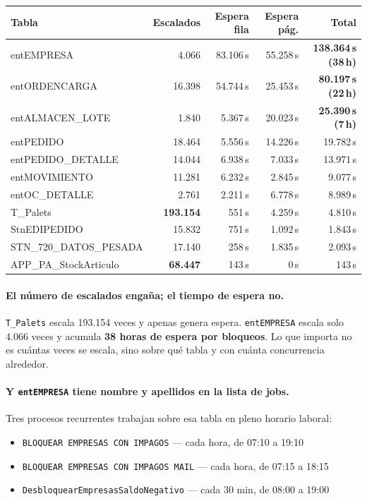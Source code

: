 \documentclass[11pt,a4paper]{article}
\newcommand{\cod}[1]{\texttt{\small #1}}
\newcommand{\critico}[1]{\textcolor{rojo}{\textbf{#1}}}
\newcommand{\aviso}[1]{\textcolor{ambar}{\textbf{#1}}}
\begin{document}
\begin{table}[h]
\centering
\small
\begin{tabular}{lrrrr}
\toprule
\textbf{Tabla} & \textbf{Escalados} & \textbf{Espera fila} &
\textbf{Espera pág.} & \textbf{Total} \\
\midrule
entEMPRESA        &  4.066 & 83.106\,s & 55.258\,s & \critico{138.364\,s (38\,h)} \\
entORDENCARGA     & 16.398 & 54.744\,s & 25.453\,s & \critico{80.197\,s (22\,h)} \\
entALMACEN\_LOTE  &  1.840 &  5.367\,s & 20.023\,s & \critico{25.390\,s (7\,h)} \\
entPEDIDO         & 18.464 &  5.556\,s & 14.226\,s & 19.782\,s \\
entPEDIDO\_DETALLE& 14.044 &  6.938\,s &  7.033\,s & 13.971\,s \\
entMOVIMIENTO     & 11.281 &  6.232\,s &  2.845\,s &  9.077\,s \\
entOC\_DETALLE    &  2.761 &  2.211\,s &  6.778\,s &  8.989\,s \\
T\_Palets         & \aviso{193.154} & 551\,s & 4.259\,s & 4.810\,s \\
StnEDIPEDIDO      & 15.832 & 751\,s & 1.092\,s & 1.843\,s \\
STN\_720\_DATOS\_PESADA & 17.140 & 258\,s & 1.835\,s & 2.093\,s \\
APP\_PA\_StockArticulo & \aviso{68.447} & 143\,s & 0\,s & 143\,s \\
\bottomrule
\end{tabular}
\end{table}

\paragraph{El número de escalados engaña; el tiempo de espera no.}
\cod{T\_Palets} escala 193.154 veces y apenas genera espera.
\cod{entEMPRESA} escala solo 4.066 veces y acumula \textbf{38 horas de espera
por bloqueos}. Lo que importa no es cuántas veces se escala, sino sobre qué
tabla y con cuánta concurrencia alrededor.

\paragraph{Y \cod{entEMPRESA} tiene nombre y apellidos en la lista de jobs.}
Tres procesos recurrentes trabajan sobre esa tabla en pleno horario laboral:

\begin{itemize}\itemsep1pt
  \item \cod{BLOQUEAR EMPRESAS CON IMPAGOS} — cada hora, de 07:10 a 19:10
  \item \cod{BLOQUEAR EMPRESAS CON IMPAGOS MAIL} — cada hora, de 07:15 a 18:15
  \item \cod{DesbloquearEmpresasSaldoNegativo} — cada 30 min, de 08:00 a 19:00
\end{itemize}
\end{document}
